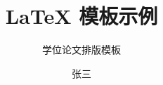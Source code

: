 \documentclass{main}
\title{LaTeX 模板示例}
\subtitle{学位论文排版模板}
\author{张三}
\begin{document}
\makecover



\frontmatter


\tableofcontents  %



% 

\mainmatter






\backmatter




\appendix


% 
\end{document}
